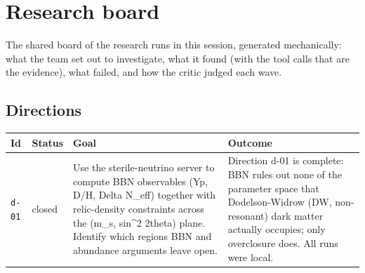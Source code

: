 \documentclass[11pt,a4paper]{article}
\begin{document}
\section{Research board}
\label{app:board}
The shared board of the research runs in this session, generated mechanically: what the team set out to investigate, what it found (with the tool calls that are the evidence), what failed, and how the critic judged each wave.
\subsection{Directions}
\begin{longtable}{@{}p{}p{}p{}p{}@{}}
\toprule Id & Status & Goal & Outcome \\ \midrule \endhead
\texttt{d-01} & closed & Use the sterile-neutrino server to compute BBN observables (Yp, D/H, Delta N\_eff) together with relic-density constraints across the (m\_s, sin\textasciicircum{}2 2theta) plane. Identify which regions BBN and abundance arguments leave open. & Direction d-01 is complete: BBN rules out none of the parameter space that Dodelson-Widrow (DW, non-resonant) dark matter actually occupies; only overclosure does. All runs were local.


\end{longtable}
\end{document}
